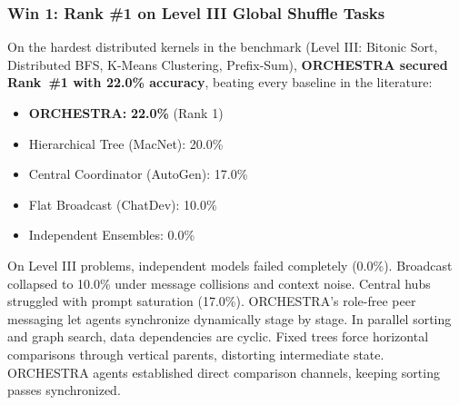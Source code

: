 \documentclass{ieeeaccess}
\begin{document}
\begin{table}[!t]
\centering
\caption{Performance Breakdown by Task Complexity Tier (Combined $N=2$ and $N=5$, 10 Controlled Runs Per Cell).}
\label{tab:complexity_breakdown}
\end{table}

\subsubsection{Win 1: Rank \#1 on Level III Global Shuffle Tasks}
On the hardest distributed kernels in the benchmark (Level III: Bitonic Sort, Distributed BFS, K-Means Clustering, Prefix-Sum), \textbf{ORCHESTRA secured Rank~\#1 with 22.0\% accuracy}, beating every baseline in the literature:
\begin{itemize}
    \item \textbf{ORCHESTRA:} \textbf{22.0\%} (Rank 1)
    \item Hierarchical Tree (MacNet): 20.0\%
    \item Central Coordinator (AutoGen): 17.0\%
    \item Flat Broadcast (ChatDev): 10.0\%
    \item Independent Ensembles: 0.0\%
\end{itemize}
On Level III problems, independent models failed completely (0.0\%). Broadcast collapsed to 10.0\% under message collisions and context noise. Central hubs struggled with prompt saturation (17.0\%). ORCHESTRA's role-free peer messaging let agents synchronize dynamically stage by stage. In parallel sorting and graph search, data dependencies are cyclic. Fixed trees force horizontal comparisons through vertical parents, distorting intermediate state. ORCHESTRA agents established direct comparison channels, keeping sorting passes synchronized.
\end{document}
